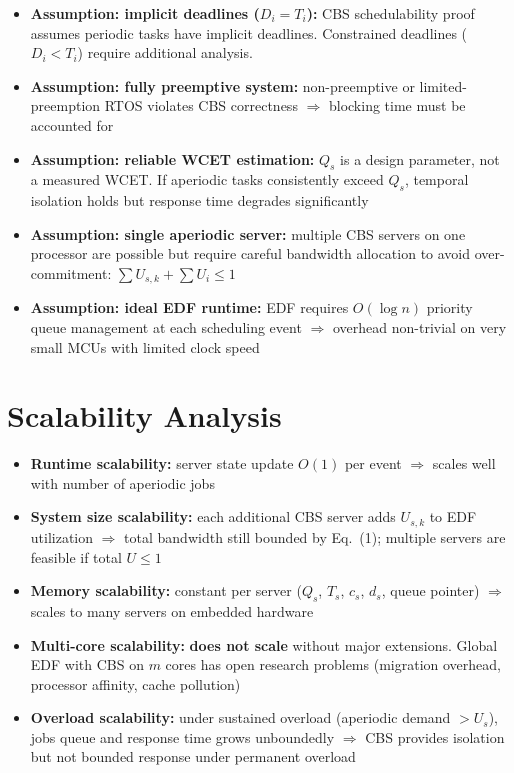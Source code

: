 \documentclass[conference]{IEEEtran}
\begin{document}
\begin{itemize}
  \item \textbf{Assumption: implicit deadlines ($D_i = T_i$):}
        CBS schedulability proof assumes periodic tasks have implicit
        deadlines. Constrained deadlines ($D_i < T_i$) require
        additional analysis.
  \item \textbf{Assumption: fully preemptive system:}
        non-preemptive or limited-preemption RTOS violates CBS
        correctness $\Rightarrow$ blocking time must be accounted for
  \item \textbf{Assumption: reliable WCET estimation:}
        $Q_s$ is a design parameter, not a measured WCET. If aperiodic
        tasks consistently exceed $Q_s$, temporal isolation holds but
        response time degrades significantly
  \item \textbf{Assumption: single aperiodic server:}
        multiple CBS servers on one processor are possible but require
        careful bandwidth allocation to avoid over-commitment:
        $\sum U_{s,k} + \sum U_i \leq 1$
  \item \textbf{Assumption: ideal EDF runtime:}
        EDF requires $O(\log n)$ priority queue management at each
        scheduling event $\Rightarrow$ overhead non-trivial on very
        small MCUs with limited clock speed
\end{itemize}

\section{Scalability Analysis}

\begin{itemize}
  \item \textbf{Runtime scalability:}
        server state update $O(1)$ per event $\Rightarrow$ scales well
        with number of aperiodic jobs
  \item \textbf{System size scalability:}
        each additional CBS server adds $U_{s,k}$ to EDF utilization
        $\Rightarrow$ total bandwidth still bounded by Eq.~(1);
        multiple servers are feasible if total $U \leq 1$
  \item \textbf{Memory scalability:}
        constant per server ($Q_s$, $T_s$, $c_s$, $d_s$, queue pointer)
        $\Rightarrow$ scales to many servers on embedded hardware
  \item \textbf{Multi-core scalability:}
        \textbf{does not scale} without major extensions. Global EDF
        with CBS on $m$ cores has open research problems (migration
        overhead, processor affinity, cache pollution)
  \item \textbf{Overload scalability:}
        under sustained overload (aperiodic demand $> U_s$), jobs queue
        and response time grows unboundedly $\Rightarrow$ CBS provides
        isolation but not bounded response under permanent overload
\end{itemize}
\end{document}
